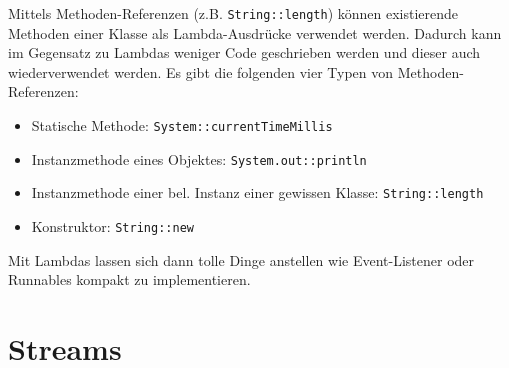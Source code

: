 Mittels Methoden-Referenzen (z.B. \verb|String::length|) können existierende Methoden einer Klasse als Lambda-Ausdrücke verwendet werden. Dadurch kann im Gegensatz zu Lambdas weniger Code geschrieben werden und dieser auch wiederverwendet werden. Es gibt die folgenden vier Typen von Methoden-Referenzen:
\begin{itemize}
	\item Statische Methode: \verb|System::currentTimeMillis|
	\item Instanzmethode eines Objektes: \verb|System.out::println|
	\item Instanzmethode einer bel. Instanz einer gewissen Klasse: \verb|String::length|
	\item Konstruktor: \verb|String::new|
\end{itemize}
Mit Lambdas lassen sich dann tolle Dinge anstellen wie Event-Listener oder Runnables kompakt zu implementieren.

\section{Streams}

